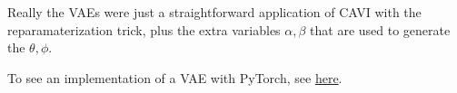   Really the VAEs were just a straightforward application of CAVI with the reparamaterization trick, plus the extra variables $\alpha, \beta$ that are used to generate the $\theta, \phi$. 

  \begin{algo}
    To see an implementation of a VAE with PyTorch, see \href{code/vae.html}{here}. 
  \end{algo} 

